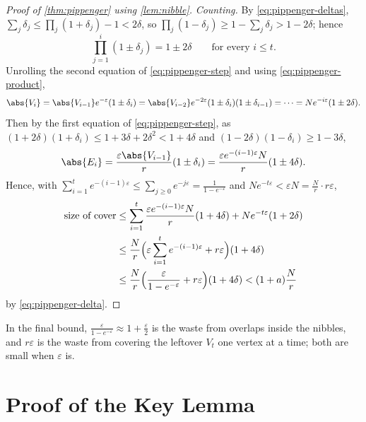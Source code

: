\begin{proof}[Proof of \autoref{thm:pippenger} using \autoref{lem:nibble}]
    \emph{Counting.} By \eqref{eq:pippenger-deltas}, \(\sum_{j} \delta_{j} \le \prod_{j}(1 + \delta_{j}) - 1 < 2\delta\), so \(\prod_{j}(1 - \delta_{j}) \ge 1 - \sum_{j} \delta_{j} > 1 - 2\delta\); hence
    \begin{equation}\label{eq:pippenger-product}
        \prod_{j=1}^{i} (1 \pm \delta_{j}) = 1 \pm 2\delta \qquad\text{for every } i \le t .
    \end{equation}
    Unrolling the second equation of \eqref{eq:pippenger-step} and using \eqref{eq:pippenger-product},
    \[
        \abs{V_{i}} = \abs{V_{i-1}} e^{-\varepsilon} (1 \pm \delta_{i})
        = \abs{V_{i-2}} e^{-2\varepsilon} (1 \pm \delta_{i})(1 \pm \delta_{i-1})
        = \cdots
        = N e^{-i\varepsilon} (1 \pm 2\delta).
    \]
    Then by the first equation of \eqref{eq:pippenger-step}, as \((1 + 2\delta)(1 + \delta_{i}) \le 1 + 3\delta + 2\delta^{2} < 1 + 4\delta\) and \((1 - 2\delta)(1 - \delta_{i}) \ge 1 - 3\delta\),
    \[
        \abs{E_{i}} = \frac{\varepsilon \abs{V_{i-1}}}{r} (1 \pm \delta_{i})
        = \frac{\varepsilon e^{-(i-1)\varepsilon} N}{r} (1 \pm 4\delta).
    \]
    Hence, with \(\sum_{i=1}^{t} e^{-(i-1)\varepsilon} \le \sum_{j \ge 0} e^{-j\varepsilon} = \frac{1}{1 - e^{-\varepsilon}}\) and \(N e^{-t\varepsilon} < \varepsilon N = \frac{N}{r} \cdot r\varepsilon\),
    \[
        \begin{aligned}
            \text{size of cover}
            &\le \sum_{i=1}^{t} \frac{\varepsilon e^{-(i-1)\varepsilon} N}{r} (1 + 4\delta) + N e^{-t\varepsilon} (1 + 2\delta) \\
            &\le \frac{N}{r} \Bigl( \varepsilon \sum_{i=1}^{t} e^{-(i-1)\varepsilon} + r\varepsilon \Bigr) (1 + 4\delta) \\
            &\le \frac{N}{r} \Bigl( \frac{\varepsilon}{1 - e^{-\varepsilon}} + r\varepsilon \Bigr) (1 + 4\delta)
            < (1 + a) \frac{N}{r}
        \end{aligned}
    \]
    by \eqref{eq:pippenger-delta}.
\end{proof}

In the final bound, \(\frac{\varepsilon}{1 - e^{-\varepsilon}} \approx 1 + \frac{\varepsilon}{2}\) is the waste from overlaps inside the nibbles, and \(r\varepsilon\) is the waste from covering the leftover \(V_{t}\) one vertex at a time; both are small when \(\varepsilon\) is.

\section{Proof of the Key Lemma}\label{sec:nibble-lemma-proof}

